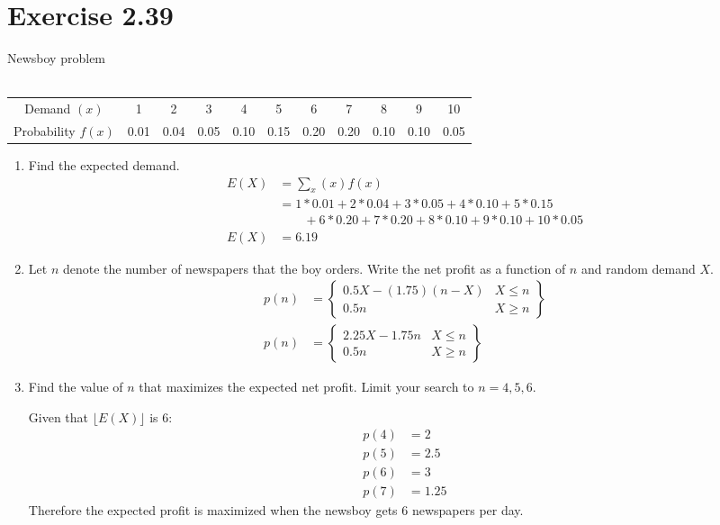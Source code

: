\documentclass{article}
\begin{document}
\section*{Exercise 2.39}
Newsboy problem\\\\
\begin{tabular}{ccccccccccc}
	\hline 
	Demand $(x)$ & 1 & 2 & 3 & 4 & 5 & 6 & 7 & 8 & 9 & 10 \\ 
	Probability $f(x)$ & 0.01 & 0.04 & 0.05 & 0.10 & 0.15 & 0.20 & 0.20 & 0.10 & 0.10 & 0.05 \\ 
	\hline 
\end{tabular} 

\begin{enumerate}[\quad(a)]
	\item Find the expected demand.
	\begin{align*}
		E(X) &= \sum_x (x)f(x)\\
		&=  1 * 0.01 + 2 * 0.04 + 3 * 0.05 + 4 * 0.10 + 5 * 0.15 \\
		&\qquad + 6 * 0.20 + 7 * 0.20 + 8 * 0.10 + 9 * 0.10 +10 * 0.05\\
		E(X)&= 6.19
	\end{align*}
	\item Let $n$ denote the number of newspapers that the boy orders. Write the net profit as a function of $n$ and random demand $X$.
	\begin{align*}
		p(n) &= \left\{
		\begin{array}{ll}
			0.5X - (1.75)(n-X)& X\leq n\\
			0.5n & X \ge n
		\end{array}\right\}\\
		p(n) &= \left\{
		\begin{array}{ll}
		2.25X - 1.75n& X\leq n\\
		0.5n & X \ge n
		\end{array}\right\}
	\end{align*}
	\item Find the value of $n$ that maximizes the expected net profit. Limit your search to $n=4,5,6$.
	
	Given that $\lfloor E(X)\rfloor$ is 6:
	\begin{align*}
		p(4) &= 2\\
		p(5) &= 2.5\\
		p(6) &= 3\\
		p(7) &= 1.25
	\end{align*}
	Therefore the expected profit is maximized when the newsboy gets 6 newspapers per day.
\end{enumerate}
\end{document}
